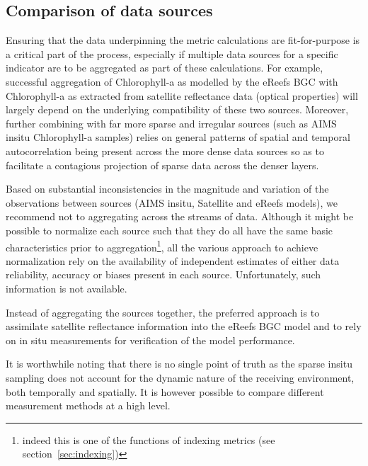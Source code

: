 \subsection{Comparison of data sources}

Ensuring that the data underpinning the metric calculations are fit-for-purpose is a critical part
of the process, especially if multiple data sources for a specific indicator are to be aggregated as
part of these calculations.  For example, successful aggregation of Chlorophyll-a as modelled by the
eReefs BGC with Chlorophyll-a as extracted from satellite reflectance data (optical properties) will
largely depend on the underlying compatibility of these two sources.  Moreover, further combining
with far more sparse and irregular sources (such as AIMS insitu Chlorophyll-a samples) relies on
general patterns of spatial and temporal autocorrelation being present across the more dense data
sources so as to facilitate a contagious projection of sparse data across the denser layers.


Based on substantial inconsistencies in the magnitude and variation of the observations between
sources (AIMS insitu, Satellite and eReefs models), we recommend not to aggregating across the
streams of data.  Although it might be possible to normalize each source such that they do all have
the same basic characteristics prior to aggregation\footnote{indeed this is one of the functions of
indexing metrics (see section~\ref{sec:indexing})}, all the various approach to achieve
normalization rely on the availability of independent estimates of either data reliability, accuracy
or biases present in each source.  Unfortunately, such information is not available.

Instead of aggregating the sources together, the preferred approach is to assimilate satellite
reflectance information into the eReefs BGC model and to rely on in situ measurements for
verification of the model performance.

It is worthwhile noting that there is no single point of truth as the sparse insitu sampling does
not account for the dynamic nature of the receiving environment, both temporally and spatially.  It
is however possible to compare different measurement methods at a high level.

